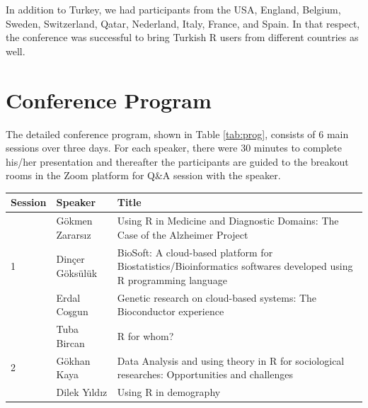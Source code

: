 In addition to Turkey, we had participants from the USA, England, Belgium, Sweden, Switzerland, Qatar, Nederland, Italy, France, and Spain. In that respect, the conference was successful to bring Turkish R users from different countries as well. 

\section{Conference Program}
{
The detailed conference program, shown in Table \ref{tab:prog}, consists of 6 main sessions over three days. For each speaker, there were 30 minutes to complete his/her presentation and thereafter the participants are guided to the breakout rooms in the Zoom platform for Q\&A session with the speaker.  

\begin{table}[h]
    \centering
    \begin{tabular}{p{1cm}p{4cm}p{6cm}}\hline
         \textbf{Session} &\textbf{Speaker} & \textbf{Title} \\\hline
         
         & Gökmen Zararsız & Using R in Medicine and Diagnostic Domains: The Case of the Alzheimer Project \vspace{2mm}\\\cline{2-3}
         
         1 & Dinçer Göksülük & BioSoft: A cloud-based platform for Biostatistics/Bioinformatics softwares developed using R programming language \vspace{2mm}\\\cline{2-3}
         
         & Erdal Coşgun & Genetic research on cloud-based systems: The Bioconductor experience \vspace{2mm}\\\hline
         
         & Tuba Bircan & R for whom? \vspace{2mm}\\\cline{2-3}
         
         2& Gökhan Kaya & Data Analysis and using theory in R for sociological researches: Opportunities and challenges \vspace{2mm}\\\cline{2-3}
         
         & Dilek Yıldız & Using R in demography \vspace{2mm}\\\cline{2-3}
         

\end{tabular}
\end{table}}
